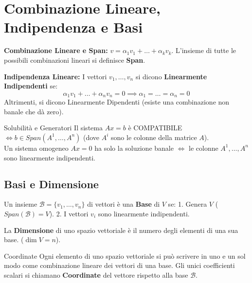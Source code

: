 \section{Combinazione Lineare, Indipendenza e Basi}

\begin{definitionbox}
\textbf{Combinazione Lineare e Span:} $v = \alpha_1 v_1 + \dots + \alpha_k v_k$. L'insieme di tutte le possibili combinazioni lineari si definisce \textbf{Span}.

\textbf{Indipendenza Lineare:} I vettori $v_1, \dots, v_n$ si dicono \textbf{Linearmente Indipendenti} se:
$$ \alpha_1 v_1 + \dots + \alpha_n v_n = 0 \implies \alpha_1 = \dots = \alpha_n = 0 $$
Altrimenti, si dicono Linearmente Dipendenti (esiste una combinazione non banale che dà zero).
\end{definitionbox}

\begin{proposition}{Solubilità e Generatori}{}
Il sistema $Ax = b$ è COMPATIBILE $\iff b \in Span(A^1, \dots, A^n)$ (dove $A^i$ sono le colonne della matrice $A$).\\
Un sistema omogeneo $Ax = 0$ ha solo la soluzione banale $\iff$ le colonne $A^1, \dots, A^n$ sono linearmente indipendenti.
\end{proposition}

\subsection{Basi e Dimensione}

\begin{definitionbox}
Un insieme $\mathcal{B} = \{v_1, \dots, v_n\}$ di vettori è una \textbf{Base} di $V$ se:
1. Genera $V$ ($Span(\mathcal{B}) = V$).
2. I vettori $v_i$ sono linearmente indipendenti.

La \textbf{Dimensione} di uno spazio vettoriale è il numero degli elementi di una sua base. ($\dim V = n$).
\end{definitionbox}

\begin{concept}{Coordinate}
Ogni elemento di uno spazio vettoriale si può scrivere in uno e un sol modo come combinazione lineare dei vettori di una base.
Gli unici coefficienti scalari si chiamano \textbf{Coordinate} del vettore rispetto alla base $\mathcal{B}$.
\end{concept}

